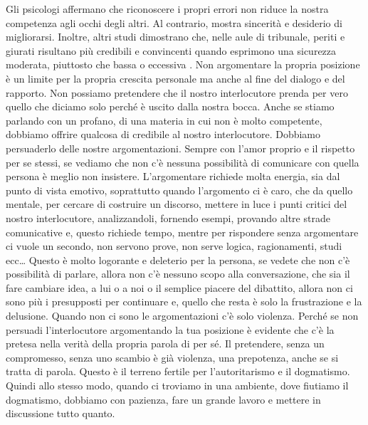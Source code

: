 \documentclass[12pt]{book} %
\begin{document}
Gli psicologi affermano che riconoscere i propri errori non riduce la nostra competenza agli occhi degli altri. Al contrario, mostra sincerità e desiderio di migliorarsi. Inoltre, altri studi dimostrano che, nelle aule di tribunale, periti e giurati risultano più credibili e convincenti quando esprimono una sicurezza moderata, piuttosto che bassa o eccessiva .
Non argomentare la propria posizione è un limite per la propria crescita personale ma anche al fine del
dialogo e del rapporto. Non possiamo pretendere che il nostro interlocutore prenda per vero quello che diciamo solo perché è uscito
dalla nostra bocca. Anche se stiamo parlando con un profano, di una materia in cui non è molto competente, dobbiamo
offrire qualcosa di credibile al nostro interlocutore. Dobbiamo persuaderlo delle nostre argomentazioni. Sempre con
l'amor proprio e il rispetto per se stessi, se vediamo che non c'è nessuna
possibilità di comunicare con quella persona è meglio non insistere. L'argomentare richiede molta
energia, sia dal punto di vista emotivo, soprattutto quando l'argomento ci è caro, che da quello
mentale, per cercare di costruire un discorso, mettere in luce i punti critici del nostro interlocutore, analizzandoli,
fornendo esempi, provando altre strade comunicative e, questo richiede tempo, mentre per rispondere senza argomentare ci vuole
un secondo, non servono prove, non serve logica, ragionamenti, studi ecc… Questo è molto logorante e deleterio per la
persona, se vedete che non c'è possibilità di parlare, allora non c'è nessuno
scopo alla conversazione, che sia il fare cambiare idea, a lui o a noi o il semplice piacere del dibattito, allora non ci sono più i
presupposti per continuare e, quello che resta è solo la frustrazione e la delusione. 
Quando non ci sono le argomentazioni c'è solo violenza. Perché se non persuadi
l'interlocutore argomentando la tua posizione è evidente che c'è la pretesa
nella verità della propria parola di per sé. Il pretendere, senza un compromesso, senza uno scambio è già violenza, una
prepotenza, anche se si tratta di parola. Questo è il terreno fertile per
l'autoritarismo e il dogmatismo. Quindi allo stesso modo, quando ci troviamo in una ambiente, dove
fiutiamo il dogmatismo, dobbiamo con pazienza, fare un grande lavoro e mettere in discussione tutto quanto. 
\end{document}
